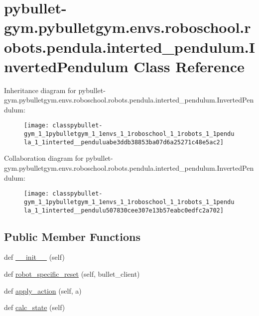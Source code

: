 \hypertarget{classpybullet-gym_1_1pybulletgym_1_1envs_1_1roboschool_1_1robots_1_1pendula_1_1interted__pendulum_1_1_inverted_pendulum}{}\section{pybullet-\/gym.pybulletgym.\+envs.\+roboschool.\+robots.\+pendula.\+interted\+\_\+pendulum.\+Inverted\+Pendulum Class Reference}
\label{classpybullet-gym_1_1pybulletgym_1_1envs_1_1roboschool_1_1robots_1_1pendula_1_1interted__pendulum_1_1_inverted_pendulum}


Inheritance diagram for pybullet-\/gym.pybulletgym.\+envs.\+roboschool.\+robots.\+pendula.\+interted\+\_\+pendulum.\+Inverted\+Pendulum\+:
\nopagebreak
\begin{figure}[H]
\begin{center}
\leavevmode
\texttt{[image: classpybullet-gym\_1\_1pybulletgym\_1\_1envs\_1\_1roboschool\_1\_1robots\_1\_1pendula\_1\_1interted\_\_penduluabe3ddb38853ba07d6a25271c48e5ac2]}
\end{center}
\end{figure}


Collaboration diagram for pybullet-\/gym.pybulletgym.\+envs.\+roboschool.\+robots.\+pendula.\+interted\+\_\+pendulum.\+Inverted\+Pendulum\+:
\nopagebreak
\begin{figure}[H]
\begin{center}
\leavevmode
\texttt{[image: classpybullet-gym\_1\_1pybulletgym\_1\_1envs\_1\_1roboschool\_1\_1robots\_1\_1pendula\_1\_1interted\_\_pendulu507830cee307e13b57eabc0edfc2a702]}
\end{center}
\end{figure}
\subsection*{Public Member Functions}
\begin{DoxyCompactItemize}
\item 
def \hyperlink{classpybullet-gym_1_1pybulletgym_1_1envs_1_1roboschool_1_1robots_1_1pendula_1_1interted__pendulum_1_1_inverted_pendulum_aff621ea8e94e5fa4864c899623e3ec85}{\+\_\+\+\_\+init\+\_\+\+\_\+} (self)
\item 
def \hyperlink{classpybullet-gym_1_1pybulletgym_1_1envs_1_1roboschool_1_1robots_1_1pendula_1_1interted__pendulum_1_1_inverted_pendulum_ae5addc6780456b0484e10da5ea731c4e}{robot\+\_\+specific\+\_\+reset} (self, bullet\+\_\+client)
\item 
def \hyperlink{classpybullet-gym_1_1pybulletgym_1_1envs_1_1roboschool_1_1robots_1_1pendula_1_1interted__pendulum_1_1_inverted_pendulum_ad3259109125f569a77fb2cd8ebbd9c5f}{apply\+\_\+action} (self, a)
\item 
def \hyperlink{classpybullet-gym_1_1pybulletgym_1_1envs_1_1roboschool_1_1robots_1_1pendula_1_1interted__pendulum_1_1_inverted_pendulum_a8ab977c9b51c50fa6388693961dc19cb}{calc\+\_\+state} (self)
\end{DoxyCompactItemize}
